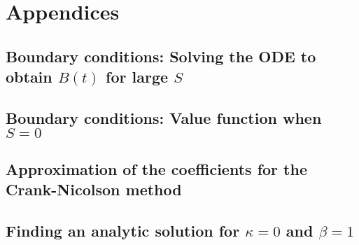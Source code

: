 \documentclass[10pt]{amsart}
\begin{document}
	\section{Appendices}
	\setcounter{secnumdepth}{2}
	\subsection{Boundary conditions: Solving the ODE to obtain $B(t)$ for large $S$}\label{app_ODE_C}
		
		\newpage
	\subsection{Boundary conditions: Value function when $S=0$}\label{app_bound_V_S0}
		
		\newpage
	\subsection{Approximation of the coefficients for the Crank-Nicolson method}\label{app_coeff_CrankNic}
		
		\newpage
	\subsection{Finding an analytic solution for $\kappa = 0$ and $\beta = 1$}
			
		\newpage
	
	
		
\end{document}
